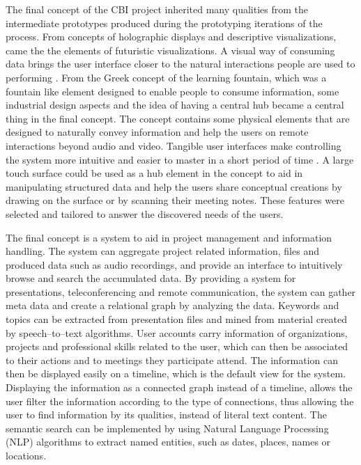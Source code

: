 \documentclass[english,12pt,a4paper,dvips]{article}
\begin{document}
The final concept of the CBI project inherited many qualities from the intermediate prototypes produced during the prototyping iterations of the process. From concepts of holographic displays and descriptive visualizations, came the the elements of futuristic visualizations. A visual way of consuming data brings the user interface closer to the natural interactions people are used to performing \cite{Underkoffler} \cite{Shaer}. From the Greek concept of the learning fountain, which was a fountain like element designed to enable people to consume information, some industrial design aspects and the idea of having a central hub became a central thing in the final concept. The concept contains some physical elements that are designed to naturally convey information and help the users on remote interactions beyond audio and video. Tangible user interfaces make controlling the system more intuitive and easier to master in a short period of time \cite{Shaer}. A large touch surface could be used as a hub element in the concept to aid in manipulating structured data and help the users share conceptual creations by drawing on the surface or by scanning their meeting notes. These features were selected and tailored to answer the discovered needs of the users.

The final concept is a system to aid in project management and information handling. The system can aggregate project related information, files and produced data such as audio recordings, and provide an interface to intuitively browse and search the accumulated data. By providing a system for presentations, teleconferencing and remote communication, the system can gather meta data and create a relational graph by analyzing the data. Keywords and topics can be extracted from presentation files and mined from material created by speech--to--text algorithms. User accounts carry information of organizations, projects and professional skills related to the user, which can then be associated to their actions and to meetings they participate attend. The information can then be displayed easily on a timeline, which is the default view for the system. Displaying the information as a connected graph instead of a timeline, allows the user filter the information according to the type of connections, thus allowing the user to find information by its qualities, instead of literal text content. The semantic search can be implemented by using Natural Language Processing (NLP) algorithms to extract named entities, such as dates, places, names or locations.
\end{document}
